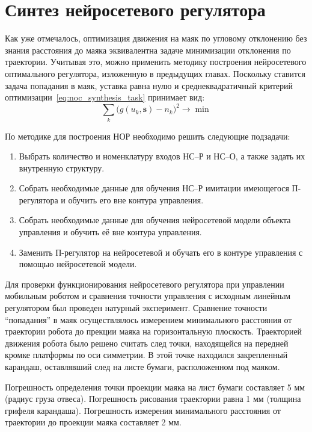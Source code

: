 \section{Синтез нейросетевого регулятора}

Как уже отмечалось, оптимизация движения на маяк по угловому
отклонению без знания расстояния до маяка эквивалентна задаче
минимизации отклонения по траектории.  Учитывая это, можно применить
методику построения нейросетевого оптимального регулятора, изложенную
в предыдущих главах.  Поскольку ставится задача попадания в маяк,
уставка равна нулю и среднеквадратичный критерий
оптимизации~\eqref{eq:noc_synthesis_task} принимает вид:
\begin{equation}\label{eq:mobot-task}
  \sum\limits_k\big(g(u_k,\mathbf{s})-n_k\big)^2\rightarrow\min
\end{equation}

По методике для построения НОР необходимо решить следующие подзадачи:
\begin{enumerate}
\item Выбрать количество и номенклатуру входов НС--Р и НС--О, а также
      задать их внутренную структуру.

\item Собрать необходимые данные для обучения НС--Р имитации имеющегося
      П-регулятора и обучить его вне контура управления.

\item Собрать необходимые данные для обучения нейросетевой модели
      объекта управления и обучить её вне контура управления.

\item Заменить П-регулятор на нейросетевой и обучать его в контуре
      управления с помощью нейросетевой модели.
\end{enumerate}

Для проверки функционирования нейросетевого регулятора при управлении
мобильным роботом и сравнения точности управления с исходным линейным
регулятором был проведен натурный эксперимент.  Сравнение точности
``попадания'' в маяк осуществлялось измерением минимального расстояния
от траектории робота до прекции маяка на горизонтальную плоскость.
Траекторией движения робота было решено считать след точки,
находящейся на передней кромке платформы по оси симметрии.  В этой
точке находился закрепленный карандаш, оставлявший след на листе
бумаги, расположенном под маяком.

Погрешность определения точки проекции маяка на лист бумаги составляет
5 мм (радиус груза отвеса).  Погрешность рисования траектории равна 1
мм (толщина грифеля карандаша).  Погрешность измерения минимального
расстояния от траектории до проекции маяка составляет 2 мм.

